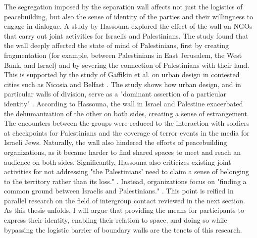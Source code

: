 \documentclass[dissertation,math,vertlayout,pdfa,colorlinks,nologo]{aaltoseries}
\begin{document}
The segregation imposed by the separation wall affects not just the logistics of peacebuilding, but also the sense of identity of the parties and their willingness to engage in dialogue. A study by Hassouna \cite{hassounaSpacesDialogueSegregated2016} explored the effect of the wall on NGOs that carry out joint activities for Israelis and Palestinians. The study found that the wall deeply affected the state of mind of Palestinians, first by creating fragmentation (for example, between Palestinians in East Jerusalem, the West Bank, and Israel) and by severing the connection of Palestinians with their land. This is supported by the study of Gaffikin et al. on urban design in contested cities such as Nicosia and Belfast \cite{gaffikinCreatingSharedPublic2010}. The study shows how urban design, and in particular walls of division, serve as a "dominant assertion of a particular identity" \cite{gaffikinCreatingSharedPublic2010}. According to Hassouna, the wall in Israel and Palestine exacerbated the dehumanization of the other on both sides, creating a sense of estrangement. The encounters between the groups were reduced to the interaction with soldiers at checkpoints for Palestinians and the coverage of terror events in the media for Israeli Jews. Naturally, the wall also hindered the efforts of peacebuilding organizations, as it became harder to find shared spaces to meet and reach an audience on both sides. Significantly, Hassouna also criticizes existing joint activities for not addressing "the Palestinians’ need to claim a sense of belonging to the territory rather than its loss." \cite[p. 79]{hassounaSpacesDialogueSegregated2016}. Instead, organizations focus on "finding a common ground between Israelis and Palestinians." \cite[p. 79]{hassounaSpacesDialogueSegregated2016}. This point is reified in parallel research on the field of intergroup contact reviewed in the next section. As this thesis unfolds, I will argue that providing the means for participants to express their identity, enabling their relation to space,  and doing so while bypassing the logistic barrier of boundary walls are the tenets of this research.
\end{document}

